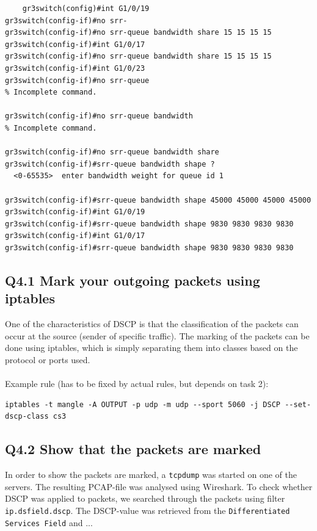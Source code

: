 \documentclass{article}
\begin{document}
\begin{verbatim}
    gr3switch(config)#int G1/0/19
gr3switch(config-if)#no srr-
gr3switch(config-if)#no srr-queue bandwidth share 15 15 15 15
gr3switch(config-if)#int G1/0/17                             
gr3switch(config-if)#no srr-queue bandwidth share 15 15 15 15
gr3switch(config-if)#int G1/0/23
gr3switch(config-if)#no srr-queue
% Incomplete command.

gr3switch(config-if)#no srr-queue bandwidth
% Incomplete command.

gr3switch(config-if)#no srr-queue bandwidth share
gr3switch(config-if)#srr-queue bandwidth shape ?
  <0-65535>  enter bandwidth weight for queue id 1

gr3switch(config-if)#srr-queue bandwidth shape 45000 45000 45000 45000  
gr3switch(config-if)#int G1/0/19
gr3switch(config-if)#srr-queue bandwidth shape 9830 9830 9830 9830
gr3switch(config-if)#int G1/0/17
gr3switch(config-if)#srr-queue bandwidth shape 9830 9830 9830 9830

\end{verbatim}

\subsection{Q4.1 Mark your outgoing packets using iptables}
One of the characteristics of DSCP is that the classification of the packets can occur at the source (sender of specific traffic). The marking of the packets can be done using iptables, which is simply separating them into classes based on the protocol or ports used.\\
\\
Example rule (has to be fixed by actual rules, but depends on task 2):
\begin{verbatim}
iptables -t mangle -A OUTPUT -p udp -m udp --sport 5060 -j DSCP --set-dscp-class cs3
\end{verbatim}

\subsection{Q4.2 Show that the packets are marked}
In order to show the packets are marked, a \texttt{tcpdump} was started on one of the servers. The resulting PCAP-file was analysed using Wireshark. To check whether DSCP was applied to packets, we searched through the packets using filter \texttt{ip.dsfield.dscp}. The DSCP-value was retrieved from the \texttt{Differentiated Services Field} and ...
\end{document}
